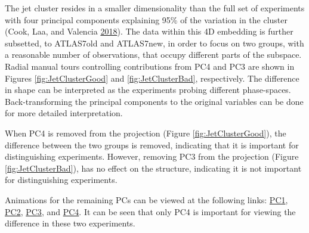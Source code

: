 The jet cluster resides in a smaller dimensionality than the full set of
experiments with four principal components explaining 95\% of the
variation in the cluster (Cook, Laa, and Valencia
\protect\hyperlink{ref-cook_dynamical_2018}{2018}). The data within this
4D embedding is further subsetted, to ATLAS7old and ATLAS7new, in order
to focus on two groups, with a reasonable number of observations, that
occupy different parts of the subspace. Radial manual tours controlling
contributions from PC4 and PC3 are shown in Figures
\ref{fig:JetClusterGood} and \ref{fig:JetClusterBad}, respectively. The
difference in shape can be interpreted as the experiments probing
different phase-spaces. Back-transforming the principal components to
the original variables can be done for more detailed interpretation.

When PC4 is removed from the projection (Figure
\ref{fig:JetClusterGood}), the difference between the two groups is
removed, indicating that it is important for distinguishing experiments.
However, removing PC3 from the projection (Figure
\ref{fig:JetClusterBad}), has no effect on the structure, indicating it
is not important for distinguishing experiments.

Animations for the remaining PCs can be viewed at the following links:
\href{https://nspyrison.netlify.com/thesis/jetcluster_manualtour_pc1/}{PC1},
\href{https://nspyrison.netlify.com/thesis/jetcluster_manualtour_pc2/}{PC2},
\href{https://nspyrison.netlify.com/thesis/jetcluster_manualtour_pc3/}{PC3},
and
\href{https://nspyrison.netlify.com/thesis/jetcluster_manualtour_pc4/}{PC4}.
It can be seen that only PC4 is important for viewing the difference in
these two experiments.

